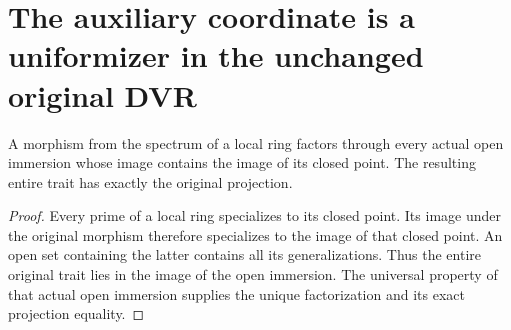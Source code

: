 \section{The auxiliary coordinate is a uniformizer in the unchanged original DVR}
\begin{lemma}\label{lem:original-whole-trait-open-lift}
A morphism from the spectrum of a local ring factors through every actual open immersion whose image contains the image of its closed point. The resulting entire trait has exactly the original projection.
\leanok
\end{lemma}
\begin{proof}
Every prime of a local ring specializes to its closed point. Its image under the original morphism therefore specializes to the image of that closed point. An open set containing the latter contains all its generalizations. Thus the entire original trait lies in the image of the open immersion. The universal property of that actual open immersion supplies the unique factorization and its exact projection equality.
\end{proof}

